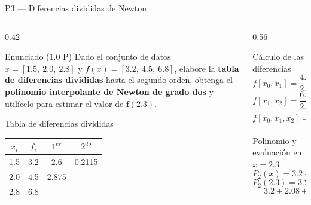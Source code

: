 \documentclass[aspectratio=169,10pt]{beamer}
\begin{document}
\begin{frame}{P3 — Diferencias divididas de Newton}
\begin{columns}[T]
\begin{column}{0.42\textwidth}
\begin{cardidea}{Enunciado \textmd{\small(1.0 P)}}{\faQuestionCircle}
{\footnotesize Dado el conjunto de datos $x=[1.5,\ 2.0,\ 2.8]$ y $f(x)=[3.2,\ 4.5,\ 6.8]$, elabore la \textbf{tabla de diferencias divididas} hasta el segundo orden, obtenga el \textbf{polinomio interpolante de Newton de grado dos} y utilícelo para estimar el valor de $\mathbf{f(2.3)}$.}
\end{cardidea}
\vspace{1mm}
\begin{cardgear}{Tabla de diferencias divididas}{\faTable}
\centering
{\footnotesize\renewcommand{\arraystretch}{1.25}\setlength{\tabcolsep}{5pt}
\begin{tabular}{c|c|c|c}
$x_i$ & $f_i$ & $1^{er}$ & $2^{do}$\\\hline
1.5 & 3.2 & 2.6 & 0.2115\\
2.0 & 4.5 & 2.875 & \\
2.8 & 6.8 & & \\
\end{tabular}}
\end{cardgear}
\end{column}
\begin{column}{0.56\textwidth}
\begin{cardgear}{Cálculo de las diferencias}{\faCalculator}
{\footnotesize
\[
f[x_0,x_1]=\frac{4.5-3.2}{2.0-1.5}=\frac{1.3}{0.5}=2.6,
\]
\[
f[x_1,x_2]=\frac{6.8-4.5}{2.8-2.0}=\frac{2.3}{0.8}=2.875,
\]
\[
f[x_0,x_1,x_2]=\frac{2.875-2.6}{2.8-1.5}=\frac{0.275}{1.3}=0.2115.
\]}
\end{cardgear}
\vspace{1mm}
\begin{cardgear}{Polinomio y evaluación en $x=2.3$}{\faSuperscript}
{\footnotesize
\[
P_2(x)=3.2+2.6(x{-}1.5)+0.2115(x{-}1.5)(x{-}2.0).
\]
\[
P_2(2.3)=3.2+2.6(0.8)+0.2115(0.8)(0.3)
\]
\[
=3.2+2.08+0.05076=\boxed{5.331}.
\]}
\end{cardgear}
\end{column}
\end{columns}
\end{frame}
\end{document}
